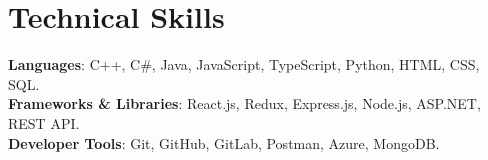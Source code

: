 \section{Technical Skills}
\begin{itemize}[leftmargin=0.15in, label={}]
    \small{\item{
        \textbf{Languages}{: C++, C\#, Java, JavaScript, TypeScript, Python, HTML, CSS, SQL.} \\
     
        \textbf{Frameworks \& Libraries}{: React.js, Redux, Express.js, Node.js, ASP.NET, REST API.} \\

        \textbf{Developer Tools}{: Git, GitHub, GitLab, Postman, Azure, MongoDB.} \\
    }}
\end{itemize}